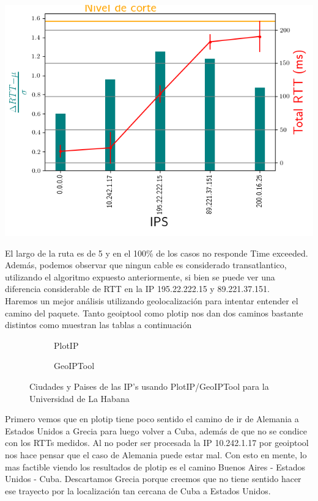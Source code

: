  \includegraphics[scale=0.8]{imagenes/rtts_habana.png}

El largo de la ruta es de 5 y en el 100\% de los casos no responde Time exceeded. Adem\'as, podemos observar que ningun cable es considerado transatlantico, utilizando el algoritmo expuesto anteriormente, si bien se puede ver una diferencia considerable de RTT en la IP 195.22.222.15 y 89.221.37.151.  \\

Haremos un mejor an\'alisis utilizando geolocalizaci\'on para intentar entender el camino del paquete. Tanto geoiptool como plotip nos dan dos caminos bastante distintos como muestran las tablas a continuaci\'on
 
\begin{figure}[ht]
	\begin{subfigure}[b]{0.5\textwidth}
		\centering
		
		\caption{PlotIP}
	\end{subfigure}
	\begin{subfigure}[b]{0.5\textwidth}
		\centering
		
		\caption{GeoIPTool}
	\end{subfigure}
	\caption{Ciudades y Paises de las IP's usando PlotIP/GeoIPTool para la Universidad de La Habana}
\end{figure}


Primero vemos que en plotip tiene poco sentido el camino de ir de Alemania a Estados Unidos a Grecia para luego volver a Cuba, adem\'as de que no se condice con los RTTs medidos. Al no poder ser procesada la IP 10.242.1.17 por geoiptool nos hace pensar que el caso de Alemania puede estar mal. Con esto en mente, lo mas factible viendo los resultados de plotip es el camino Buenos Aires - Estados Unidos - Cuba. Descartamos Grecia porque creemos que no tiene sentido hacer ese trayecto por la localizaci\'on tan cercana de Cuba a Estados Unidos.\\


